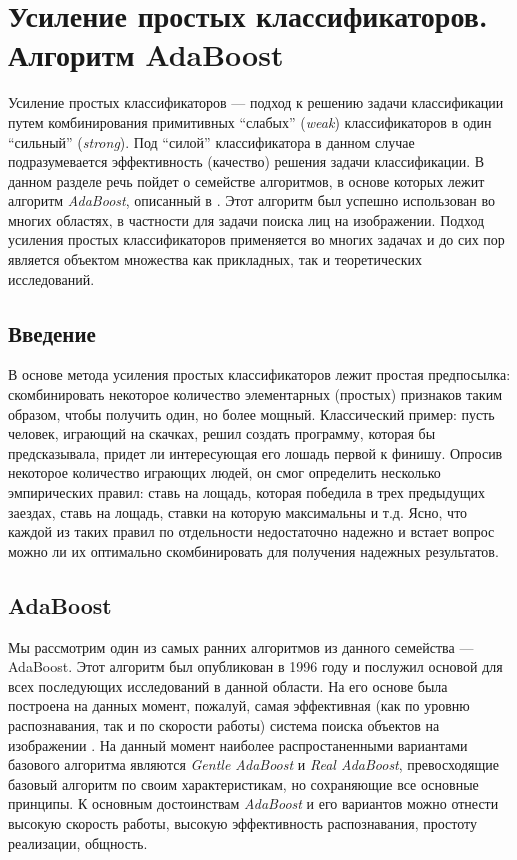 \section{Усиление простых классификаторов. Алгоритм AdaBoost}
Усиление простых классификаторов --- подход к решению задачи классификации путем комбинирования примитивных ``слабых'' (\emph{weak}) классификаторов в один ``сильный'' (\emph{strong}). Под ``силой'' классификатора в данном случае подразумевается эффективность (качество) решения задачи классификации. В данном разделе речь пойдет о семействе алгоритмов, в основе которых лежит алгоритм \emph{AdaBoost}, описанный в \cite{freund99}. Этот алгоритм был успешно использован во многих областях, в частности для задачи поиска лиц на изображении. Подход усиления простых классификаторов применяется во многих задачах и до сих пор является объектом множества как прикладных, так и теоретических исследований.

\subsection{Введение}
В основе метода усиления простых классификаторов лежит простая предпосылка: скомбинировать некоторое количество элементарных (простых) признаков таким образом, чтобы получить один, но более мощный. Классический пример: пусть человек, играющий на скачках, решил создать программу, которая бы предсказывала, придет ли интересующая его лошадь первой к финишу. Опросив некоторое количество играющих людей, он смог определить несколько эмпирических правил: ставь на лощадь, которая победила в трех предыдущих заездах, ставь на лощадь, ставки на которую максимальны и т.д. Ясно, что каждой из таких правил по отдельности недостаточно надежно и встает вопрос можно ли их оптимально скомбинировать для получения надежных результатов.

\subsection{AdaBoost}
Мы рассмотрим один из самых ранних алгоритмов из данного семейства --- AdaBoost. Этот алгоритм был опубликован в 1996 году и послужил основой для всех последующих исследований в данной области. На его основе была построена на данных момент, пожалуй, самая эффективная (как по уровню распознавания, так и по скорости работы) система поиска объектов на изображении \cite{viola01}. На данный момент наиболее распростаненными вариантами базового алгоритма являются \emph{Gentle AdaBoost} и \emph{Real AdaBoost}, превосходящие базовый алгоритм по своим характеристикам, но сохраняющие все основные принципы. К основным достоинствам \emph{AdaBoost} и его вариантов можно отнести высокую скорость работы, высокую эффективность распознавания, простоту реализации, общность.

